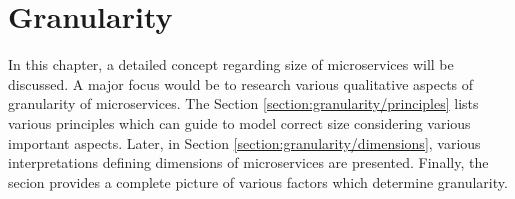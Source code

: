 \chapter{Granularity}\label{chapter:granularity}
In this chapter, a detailed concept regarding size of microservices will be discussed. A major focus would be to research various qualitative aspects of granularity of microservices. The Section \ref{section:granularity/principles} lists various principles which can guide to model correct size considering various important aspects. Later, in Section \ref{section:granularity/dimensions}, various interpretations defining dimensions of microservices are presented. Finally, the secion provides a complete picture of various factors which determine granularity.


